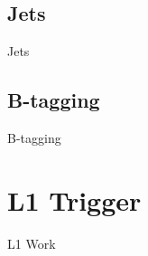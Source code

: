 \subsection{Jets}
\label{subsec:cmsobjects-jets}

Jets

\subsection{B-tagging}
\label{subsec:cmsobjects-btagging}

B-tagging

\section{L1 Trigger}
\label{sec:l1trigger}


L1 Work
